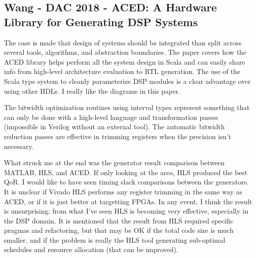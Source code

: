 \subsection{Wang - DAC 2018 - ACED: A Hardware Library for Generating DSP Systems}

The case is made that design of systems should be integrated than split across several tools, algorithms, and abstraction boundaries. The paper covers how the ACED library helps perform all the system design in Scala and can easily share info from high-level architecture evaluation to RTL generation. The use of the Scala type system to cleanly parameterize DSP modules is a clear advantage over using other HDLs. {\color{blue} I really like the diagrams in this paper.}

The bitwidth optimization routines using interval types represent something that can only be done with a high-level language and transformation passes (impossible in Verilog without an external tool). The automatic bitwidth reduction passes are effective in trimming registers when the precision isn't necessary.

{\color{blue} What struck me at the end was the generator result comparison between MATLAB, HLS, and ACED. If only looking at the area, HLS produced the best QoR. I would like to have seen timing slack comparisons between the generators. It is unclear if Vivado HLS performs any register trimming in the same way as ACED, or if it is just better at targetting FPGAs. In any event, I think the result is unsurprising; from what I've seen HLS is becoming very effective, especially in the DSP domain. It is mentioned that the result from HLS required specific pragmas and refactoring, but that may be OK if the total code size is much smaller, and if the problem is really the HLS tool generating sub-optimal schedules and resource allocation (that can be improved).}


